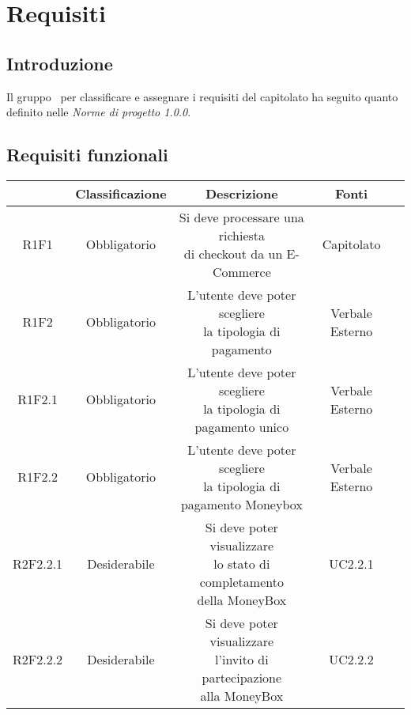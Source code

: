 \section{Requisiti}

\subsection{Introduzione}
Il gruppo \groupName\ per classificare e assegnare i requisiti del capitolato ha seguito quanto definito nelle \textit{Norme di progetto 1.0.0}.

\subsection{Requisiti funzionali}
\begin{center}
	\renewcommand{\arraystretch}{1.8}
	\begin{longtable}[c]{c | c | c | c | p{5cm}}
		\rowcolor[HTML]{125E28}
		\multicolumn{1}{c}{\color[HTML]{FFFFFF} \textbf{Codice}} & 
		\multicolumn{1}{c}{\color[HTML]{FFFFFF} \textbf{Classificazione}} & 
		\multicolumn{1}{c}{\color[HTML]{FFFFFF} \textbf{Descrizione}} & 
		\multicolumn{1}{c}{\color[HTML]{FFFFFF} \textbf{Fonti}} \\
		\endhead
        R1F1 & Obbligatorio & \shortstack{Si deve processare una richiesta\\ di checkout da un E-Commerce} & Capitolato \\
        R1F2 & Obbligatorio & \shortstack{L'utente deve poter scegliere \\la tipologia di pagamento} & Verbale Esterno \\
        R1F2.1 & Obbligatorio & \shortstack{L'utente deve poter scegliere \\la tipologia di pagamento unico} & Verbale Esterno \\
        R1F2.2 & Obbligatorio & \shortstack{L'utente deve poter scegliere \\la tipologia di pagamento Moneybox} & Verbale Esterno \\
        R2F2.2.1 & Desiderabile &\shortstack{Si deve poter visualizzare \\lo stato di completamento \\della MoneyBox} & UC2.2.1 \\
        R2F2.2.2 & Desiderabile &\shortstack{Si deve poter visualizzare \\l'invito di partecipazione \\alla MoneyBox} & UC2.2.2 \\

\end{longtable}
\end{center}
